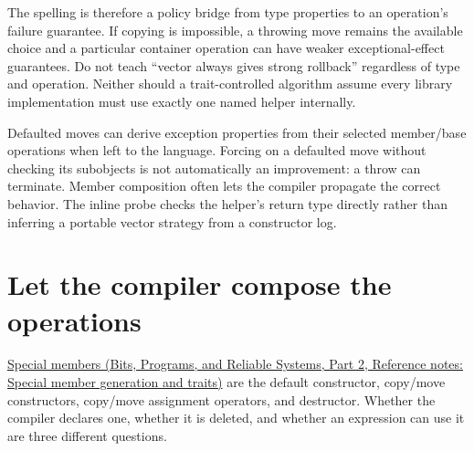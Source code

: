 The spelling is therefore a policy bridge from type properties to an operation's failure guarantee. If copying is impossible, a throwing move remains the available choice and a particular container operation can have weaker exceptional-effect guarantees. Do not teach ``vector always gives strong rollback'' regardless of type and operation. Neither should a trait-controlled algorithm assume every library implementation must use exactly one named helper internally.

Defaulted moves can derive exception properties from their selected member/base operations when left to the language. Forcing  on a defaulted move without checking its subobjects is not automatically an improvement: a throw can terminate. Member composition often lets the compiler propagate the correct behavior. The inline probe checks the helper's return type directly rather than inferring a portable vector strategy from a constructor log.

\section{Let the compiler compose the operations}\label{05-engine-i-ch003-let-the-compiler-compose-the-operations}

\hypertarget{05-engine-i-ch003-let-the-compiler-compose-the-operations}{}

\href{../01-Bits-Programs-and-Reliable-Systems-P02/main.pdf\#nameddest=appendix-42e02a12c694}{Special members (Bits, Programs, and Reliable Systems, Part 2, Reference notes: Special member generation and traits)} are the default constructor, copy/move constructors, copy/move assignment operators, and destructor. Whether the compiler declares one, whether it is deleted, and whether an expression can use it are three different questions.


